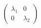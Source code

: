 \documentclass[preview]{standalone}
\begin{document}
\begin{align*}
\begin{pmatrix} \lambda_1 & 0 \\ 0 & \lambda_2 \end{pmatrix}
\end{align*}
\end{document}
